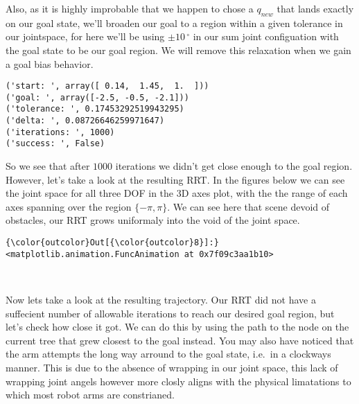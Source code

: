 \documentclass{article}
\begin{document}
Also, as it is highly improbable that we happen to chose a $q_{new}$
that lands exactly on our goal state, we'll broaden our goal to a region
within a given tolerance in our jointspace, for here we'll be using
$\pm 10\,^{\circ}$ in our sum joint configuation with the goal state to
be our goal region. We will remove this relaxation when we gain a goal
bias behavior.


    \begin{Verbatim}[commandchars=\\\{\}]
('start: ', array([ 0.14,  1.45,  1.  ]))
('goal: ', array([-2.5, -0.5, -2.1]))
('tolerance: ', 0.17453292519943295)
('delta: ', 0.08726646259971647)
('iterations: ', 1000)
('success: ', False)
    \end{Verbatim}

    So we see that after $1000$ iterations we didn't get close enough to the
goal region. However, let's take a look at the resulting RRT. In the
figures below we can see the joint space for all three DOF in the 3D
axes plot, with the the range of each axes spanning over the region
$\{-\pi,\pi\}$. We can see here that scene devoid of obstacles, our RRT
grows uniformaly into the void of the joint space.



            \begin{Verbatim}[commandchars=\\\{\}]
{\color{outcolor}Out[{\color{outcolor}8}]:} <matplotlib.animation.FuncAnimation at 0x7f09c3aa1b10>
\end{Verbatim}
        
    \begin{center}
    \end{center}
    { \hspace*{\fill} \\}
    
    Now lets take a look at the resulting trajectory. Our RRT did not have a
suffecient number of allowable iterations to reach our desired goal
region, but let's check how close it got. We can do this by using the
path to the node on the current tree that grew closest to the goal
instead. You may also have noticed that the arm attempts the long way
arround to the goal state, i.e.~in a clockways manner. This is due to
the absence of wrapping in our joint space, this lack of wrapping joint
angels however more closly aligns with the physical limatations to which
most robot arms are constrianed.
\end{document}
